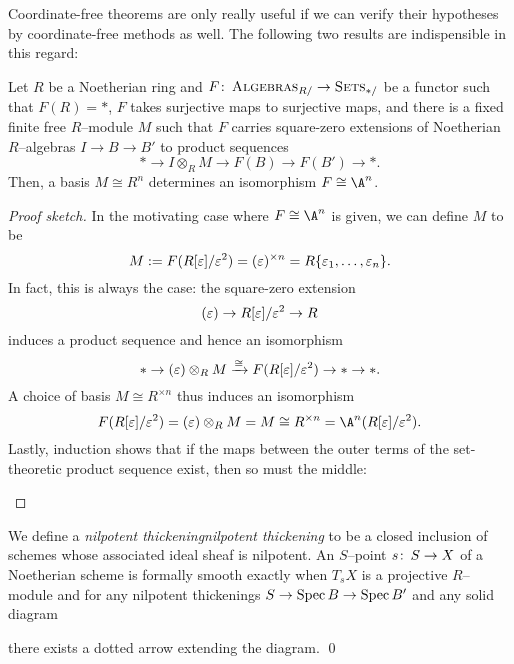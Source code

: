 Coordinate-free theorems are only really useful if we can verify their hypotheses by coordinate-free methods as well.  The following two results are indispensible in this regard:
\begin{theorem}\label{DetectingFormalVarieties}
Let \(R\) be a Noetherian ring and \(F\colon\thinspace \normalfont\textsc{Algebras}_{R/} \to \normalfont\textsc{Sets}_{*/}\) be a functor such that \(F(R) = *\), \(F\) takes surjective maps to surjective maps, and there is a fixed finite free \(R\)--module \(M\) such that \(F\) carries square-zero extensions of Noetherian \(R\)--algebras \(I \to B \to B'\) to product sequences \[* \to I \otimes_R M \to F(B) \to F(B') \to *.\]  Then, a basis \(M \cong R^n\) determines an isomorphism \(F \cong \A^n\).
\end{theorem}
\begin{proof}[Proof sketch]
In the motivating case where \(F \cong \A^n\) is given, we can define \(M\) to be \[M := F(R[\varepsilon] / \varepsilon^2) = (\varepsilon)^{\times n} = R\{\varepsilon_1, \ldots, \varepsilon_n\}.\]  In fact, this is always the case: the square-zero extension \[(\varepsilon) \to R[\varepsilon] / \varepsilon^2 \to R\] induces a product sequence and hence an isomorphism \[* \to (\varepsilon) \otimes_R M \xrightarrow{\cong} F(R[\varepsilon] / \varepsilon^2) \to * \to *.\]  A choice of basis \(M \cong R^{\times n}\) thus induces an isomorphism \[F(R[\eps] / \eps^2) = (\eps) \otimes_R M = M \cong R^{\times n} = \A^n(R[\eps] / \eps^2).\]  Lastly, induction shows that if the maps between the outer terms of the set-theoretic product sequence exist, then so must the middle:
\begin{center}
\end{center}
\vspace{-\baselineskip}
\end{proof}

\begin{corollary}
We define a \textit{nilpotent thickening}\textit{nilpotent thickening} to be a closed inclusion of schemes whose associated ideal sheaf is nilpotent.  An \(S\)--point \(s\colon\thinspace S \to X\) of a Noetherian scheme is formally smooth exactly when \(T_s X\) is a projective \(R\)--module and for any nilpotent thickenings \(S \to \operatorname{Spec} B \to \operatorname{Spec} B'\) and any solid diagram
\begin{center}
\end{center}
there exists a dotted arrow extending the diagram. \qed
\end{corollary}

